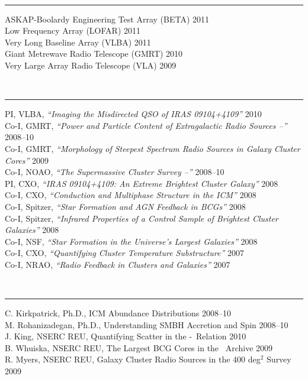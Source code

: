 \documentclass[12pt]{cv}
\begin{document}
{\large{}}\vspace{-0.3cm}\\
\rule{\linewidth}{0.5pt}
ASKAP-Boolardy Engineering Test Array (BETA) \hfill 2011\\
Low Frequency Array (LOFAR) \hfill 2011\\
Very Long Baseline Array (VLBA) \hfill 2011\\
Giant Metrewave Radio Telescope (GMRT) \hfill 2010\\
Very Large Array Radio Telescope (VLA) \hfill 2009

{\large{}}\vspace{-0.3cm}\\
\rule{\linewidth}{0.5pt}
PI, VLBA, {\it{``Imaging the Misdirected QSO of IRAS 09104+4109''}} \hfill 2010\\
Co-I, GMRT, {\it{``Power and Particle Content of Extragalactic Radio Sources --''}} \hfill 2008--10\\
Co-I, GMRT, {\it{``Morphology of Steepest Spectrum Radio Sources in Galaxy Cluster Cores''}} \hfill 2009\\
Co-I, NOAO, {\it{``The Supermassive Cluster Survey --''}} \hfill 2008--10\\
PI, CXO, {\it{``IRAS 09104+4109: An Extreme Brightest Cluster Galaxy''}} \hfill 2008\\
Co-I, CXO, {\it``{Conduction and Multiphase Structure in the ICM''}} \hfill 2008\\
Co-I, Spitzer, {\it{``Star Formation and AGN Feedback in BCGs''}} \hfill 2008\\
Co-I, Spitzer, {\it{``Infrared Properties of a Control Sample of Brightest Cluster Galaxies''}} \hfill 2008\\
Co-I, NSF, {\it{``Star Formation in the Universe's Largest Galaxies''}} \hfill 2008\\
Co-I, CXO, {\it{``Quantifying Cluster Temperature Substructure''}} \hfill 2007\\
Co-I, NRAO, {\it{``Radio Feedback in Clusters and Galaxies''}} \hfill 2007

{\large{}}\vspace{-0.3cm}\\
\rule{\linewidth}{0.5pt}
C. Kirkpatrick, Ph.D., ICM Abundance Distributions \hfill 2008--10\\
M. Rohanizadegan, Ph.D., Understanding SMBH Accretion and Spin \hfill 2008--10\\
J. King, NSERC REU, Quantifying Scatter in the \pjet-\prad\ Relation \hfill 2010\\
B. Whuiska, NSERC REU, The Largest BCG Cores in the \hst\ Archive \hfill 2009\\
R. Myers, NSERC REU, Galaxy Cluster Radio Sources in the 400 deg$^2$ Survey \hfill 2009
\end{document}

